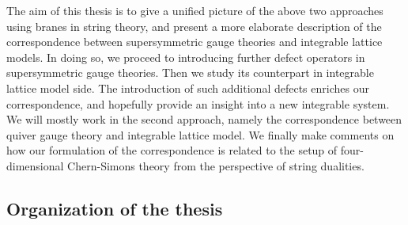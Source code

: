 The aim of this thesis is to give a unified picture of the above two approaches
using branes in string theory,
and present a more elaborate description of the correspondence between
supersymmetric gauge theories and integrable lattice models.
In doing so, we proceed to introducing further defect operators in
supersymmetric gauge theories. Then we study its counterpart in integrable
lattice model side.
The introduction of such additional defects enriches our correspondence,
and hopefully provide an insight into a new integrable system.
We will mostly work in the second approach, namely the correspondence between
quiver gauge theory and integrable lattice model.
We finally make comments on how our formulation of the correspondence is related to the setup of
four-dimensional Chern-Simons theory
from the perspective of string dualities.







\subsection*{Organization of the thesis}


